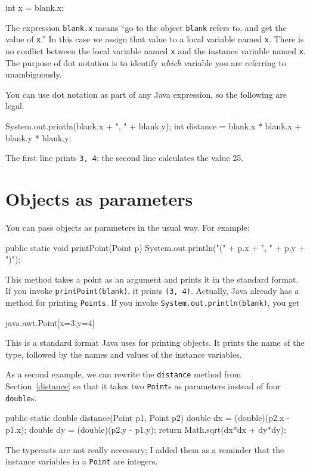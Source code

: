 \begin{code}
    int x = blank.x;
\end{code}
%
The expression {\tt blank.x} means ``go to the object {\tt blank}
refers to, and get the value of {\tt x}.''  In this case we assign
that value to a local variable named {\tt x}.  There is no
conflict between the local variable named {\tt x} and the instance
variable named {\tt x}.  The purpose of dot notation is to identify
{\em which} variable you are referring to unambiguously.

You can use dot notation as part of any Java expression, so the
following are legal.

\begin{code}
    System.out.println(blank.x + ", " + blank.y);
    int distance = blank.x * blank.x + blank.y * blank.y;
\end{code}
%
The first line prints {\tt 3, 4}; the second line calculates
the value 25.

\section{Objects as parameters}

You can pass objects as parameters in the usual way.  For
example:

\begin{code}
  public static void printPoint(Point p) {
    System.out.println("(" + p.x + ", " + p.y + ")");
  }
\end{code}
%
This method takes a point as an argument and prints it in
the standard format.  If you invoke {\tt printPoint(blank)},
it prints {\tt(3, 4)}.  Actually, Java already has a
method for printing {\tt Points}.  If you invoke
{\tt System.out.println(blank)}, you get

\begin{code}
java.awt.Point[x=3,y=4]
\end{code}
%
This is a standard format Java uses for printing objects.  It prints
the name of the type, followed by the names and values of the instance
variables.

As a second example, we can rewrite the {\tt distance} method from
Section~\ref{distance} so that it takes two {\tt Point}s as parameters
instead of four {\tt double}s.

\begin{code}
  public static double distance(Point p1, Point p2) {
    double dx = (double)(p2.x - p1.x);
    double dy = (double)(p2.y - p1.y);
    return Math.sqrt(dx*dx + dy*dy);
  }
\end{code}
%
The typecasts are not really necessary; I added them as a
reminder that the instance variables in a {\tt Point} are integers.


